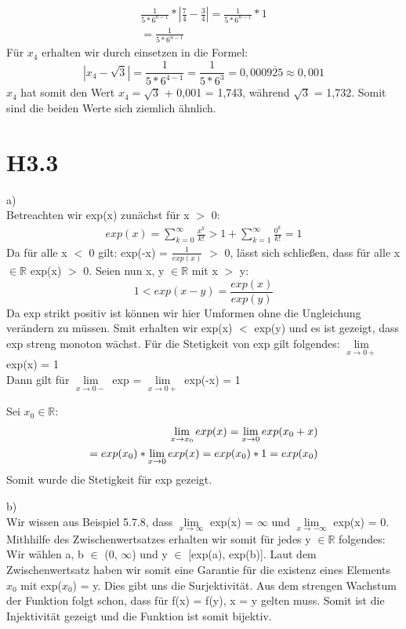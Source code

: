 \documentclass{article}
\begin{document}
\begin{align*}
    \frac{1}{5 * 6^{n - 1}} * |\frac{7}{4} - \frac{3}{4}| = \frac{1}{5 * 6^{n - 1}} * 1 \\  
    = \frac{1}{5 * 6^{n - 1}} 
\end{align*}
Für $x_4$ erhalten wir durch einsetzen in die Formel: 
\[
    |x_4 - \sqrt{3}| = \frac{1}{5 * 6^{4 - 1}} = \frac{1}{5 * 6^{3}} = 0,000\overline{925} \approx 0,001
\]
$x_4$ hat somit den Wert $x_4 = \sqrt{3}$ + 0,001 = 1,743, während $\sqrt{3}$ = 1,732. Somit sind die 
beiden Werte sich ziemlich ähnlich.

\section{H3.3}

\noindent a) \\ 
Betreachten wir exp(x) zunächst für x $>$ 0: 
\begin{align*}
    exp(x) = \sum_{k = 0}^{\infty} \frac{x^k}{k!} > 1 + \sum_{k = 1}^{\infty} \frac{0^k}{k!} = 1
\end{align*}
Da für alle x $<$ 0 gilt: exp(-x) = $\frac{1}{exp(x)}$ $>$ 0, lässt sich schließen, dass für 
alle x $\in \mathds{R}$ exp(x) $>$ 0.
Seien nun x, y $\in \mathds{R}$ mit x $>$ y: 
\[
    1 < exp(x - y) = \frac{exp(x)}{exp(y)}
\]
Da exp strikt positiv ist können wir hier Umformen ohne die Ungleichung verändern zu müssen. 
Smit erhalten wir exp(x) $<$ exp(y) und es ist gezeigt, dass exp streng monoton wächst.
Für die Stetigkeit von exp gilt folgendes: 
$\lim\limits_{x \to 0+}$ exp(x) = 1 \\ 
Dann gilt für $\lim\limits_{x \to 0-}$ exp = $\lim\limits_{x \to 0+}$ exp(-x) = 1

Sei $x_0 \in \mathds{R}$:
\begin{align*}
   \noindent \lim\limits_{x \to x_0} exp(x) = \lim\limits_{x \to 0} exp(x_0 + x) \\
                                   = exp(x_0) * \lim\limits_{x \to 0} exp(x)
                                   = exp(x_0) * 1
                                   = exp(x_0)
\end{align*}
Somit wurde die Stetigkeit für exp gezeigt.

\noindent b) \\ 
Wir wissen aus Beispiel 5.7.8, dass $\lim\limits_{x \to \infty}$ exp(x) = $\infty$ und 
$\lim\limits_{x \to - \infty}$ exp(x) = 0. Mithhilfe des Zwischenwertsatzes erhalten wir 
somit für jedes y $\in \mathds{R}$ folgendes: \\ 
Wir wählen a, b $\in$ (0, $\infty$) und y $\in$ [exp(a), exp(b)]. Laut dem Zwischenwertsatz haben wir somit eine 
Garantie für die existenz eines Elements $x_0$ mit exp($x_0$) = y.
Dies gibt uns die Surjektivität.
Aus dem strengen Wachstum der Funktion folgt schon, dass für f(x) = f(y), x = y gelten muss. Somit ist die Injektivität gezeigt und 
die Funktion ist somit bijektiv.
\end{document}
